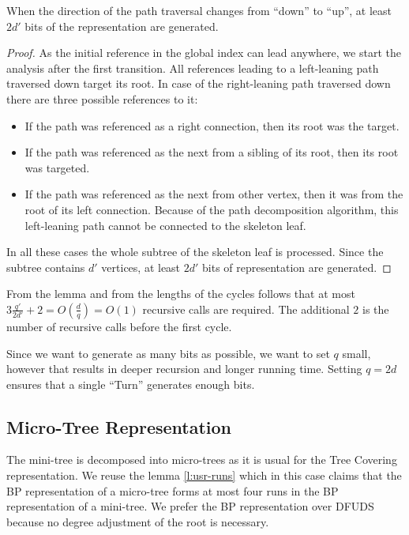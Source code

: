 \begin{lemma}
	When the direction of the path traversal changes from ``down'' to ``up'', at least $2d'$ bits of the representation are generated.
\end{lemma}
\begin{proof}
	As the initial reference in the global index can lead anywhere, we start the analysis after the first transition.
	All references leading to a left-leaning path traversed down target its root.
	In case of the right-leaning path traversed down there are three possible references to it:
	\begin{itemize}
		\item If the path was referenced as a right connection, then its root was the target.
		\item If the path was referenced as the next from a sibling of its root, then its root was targeted.
		\item If the path was referenced as the next from other vertex, then it was from the root of its left connection.
		Because of the path decomposition algorithm, this left-leaning path cannot be connected to the skeleton leaf.
	\end{itemize}

	In all these cases the whole subtree of the skeleton leaf is processed.
	Since the subtree contains $d'$ vertices, at least $2d'$ bits of representation are generated.
\end{proof}

From the lemma and from the lengths of the cycles follows that at most $3 \frac{q'}{2d'} + 2 = O(\frac{d}{q}) = O(1)$ recursive calls are required.
The additional $2$ is the number of recursive calls before the first cycle.

Since we want to generate as many bits as possible, we want to set $q$ small, however that results in deeper recursion and longer running time.
Setting $q = 2d$ ensures that a single ``Turn'' generates enough bits.

\subsection{Micro-Tree Representation}

The mini-tree is decomposed into micro-trees as it is usual for the Tree Covering representation.
We reuse the lemma \ref{l:usr-runs} which in this case claims that the BP representation of a micro-tree forms at most four runs in the BP representation of a mini-tree.
We prefer the BP representation over DFUDS because no degree adjustment of the root is necessary.

